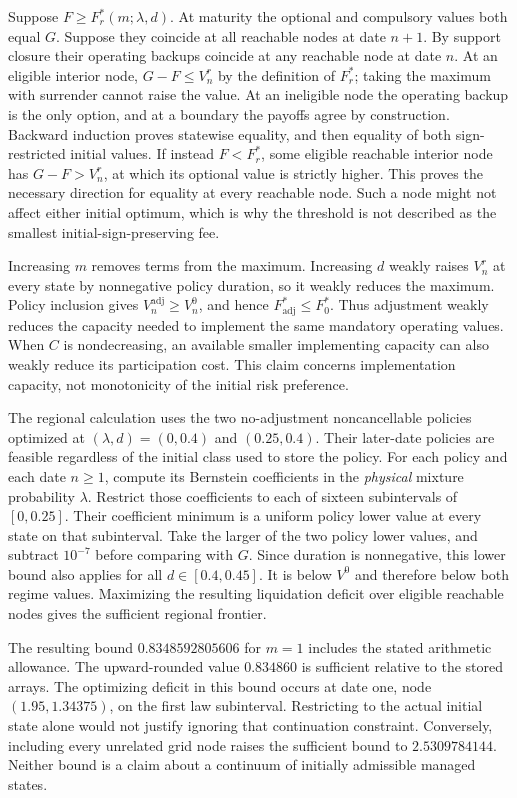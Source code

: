 Suppose $F\geq F_r^*(m;\lambda,d)$. At maturity the optional and compulsory values both equal $G$. Suppose they coincide at all reachable nodes at date $n+1$. By support closure their operating backups coincide at any reachable node at date $n$. At an eligible interior node, $G-F\leq V^r_n$ by the definition of $F_r^*$; taking the maximum with surrender cannot raise the value. At an ineligible node the operating backup is the only option, and at a boundary the payoffs agree by construction. Backward induction proves statewise equality, and then equality of both sign-restricted initial values. If instead $F<F_r^*$, some eligible reachable interior node has $G-F>V^r_n$, at which its optional value is strictly higher. This proves the necessary direction for equality at every reachable node. Such a node might not affect either initial optimum, which is why the threshold is not described as the smallest initial-sign-preserving fee.

Increasing $m$ removes terms from the maximum. Increasing $d$ weakly raises $V^r_n$ at every state by nonnegative policy duration, so it weakly reduces the maximum. Policy inclusion gives $V^{\mathrm{adj}}_n\geq V^0_n$, and hence $F^*_{\mathrm{adj}}\leq F^*_0$. Thus adjustment weakly reduces the capacity needed to implement the same mandatory operating values. When $C$ is nondecreasing, an available smaller implementing capacity can also weakly reduce its participation cost. This claim concerns implementation capacity, not monotonicity of the initial risk preference.

The regional calculation uses the two no-adjustment noncancellable policies optimized at $(\lambda,d)=(0,0.4)$ and $(0.25,0.4)$. Their later-date policies are feasible regardless of the initial class used to store the policy. For each policy and each date $n\geq1$, compute its Bernstein coefficients in the \emph{physical} mixture probability $\lambda$. Restrict those coefficients to each of sixteen subintervals of $[0,0.25]$. Their coefficient minimum is a uniform policy lower value at every state on that subinterval. Take the larger of the two policy lower values, and subtract $10^{-7}$ before comparing with $G$. Since duration is nonnegative, this lower bound also applies for all $d\in[0.4,0.45]$. It is below $V^0$ and therefore below both regime values. Maximizing the resulting liquidation deficit over eligible reachable nodes gives the sufficient regional frontier.

The resulting bound $0.8348592805606$ for $m=1$ includes the stated arithmetic allowance. The upward-rounded value $0.834860$ is sufficient relative to the stored arrays. The optimizing deficit in this bound occurs at date one, node $(1.95,1.34375)$, on the first law subinterval. Restricting to the actual initial state alone would not justify ignoring that continuation constraint. Conversely, including every unrelated grid node raises the sufficient bound to $2.5309784144$. Neither bound is a claim about a continuum of initially admissible managed states.

